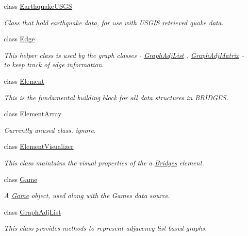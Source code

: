 \begin{DoxyCompactItemize}
class \hyperlink{classbridges_1_1_earthquake_u_s_g_s}{Earthquake\+U\+S\+G\+S}
\begin{DoxyCompactList}\small\item\em Class that hold earthquake data, for use with U\+S\+G\+I\+S retrieved quake data. \end{DoxyCompactList}\item 
class \hyperlink{classbridges_1_1_edge}{Edge}
\begin{DoxyCompactList}\small\item\em This helper class is used by the graph classes -\/ \hyperlink{classbridges_1_1_graph_adj_list}{Graph\+Adj\+List} , \hyperlink{classbridges_1_1_graph_adj_matrix}{Graph\+Adj\+Matrix} -\/ to keep track of edge information. \end{DoxyCompactList}\item 
class \hyperlink{classbridges_1_1_element}{Element}
\begin{DoxyCompactList}\small\item\em This is the fundamental building block for all data structures in B\+R\+I\+D\+G\+E\+S. \end{DoxyCompactList}\item 
class \hyperlink{classbridges_1_1_element_array}{Element\+Array}
\begin{DoxyCompactList}\small\item\em Currently unused class, ignore. \end{DoxyCompactList}\item 
class \hyperlink{classbridges_1_1_element_visualizer}{Element\+Visualizer}
\begin{DoxyCompactList}\small\item\em This class maintains the visual properties of the a \hyperlink{namespacebridges_1_1_bridges}{Bridges} element. \end{DoxyCompactList}\item 
class \hyperlink{classbridges_1_1_game}{Game}
\begin{DoxyCompactList}\small\item\em A \hyperlink{classbridges_1_1_game}{Game} object, used along with the Games data source. \end{DoxyCompactList}\item 
class \hyperlink{classbridges_1_1_graph_adj_list}{Graph\+Adj\+List}
\begin{DoxyCompactList}\small\item\em This class provides methods to represent adjacency list based graphs. \end{DoxyCompactList}\item 

\end{DoxyCompactItemize}
